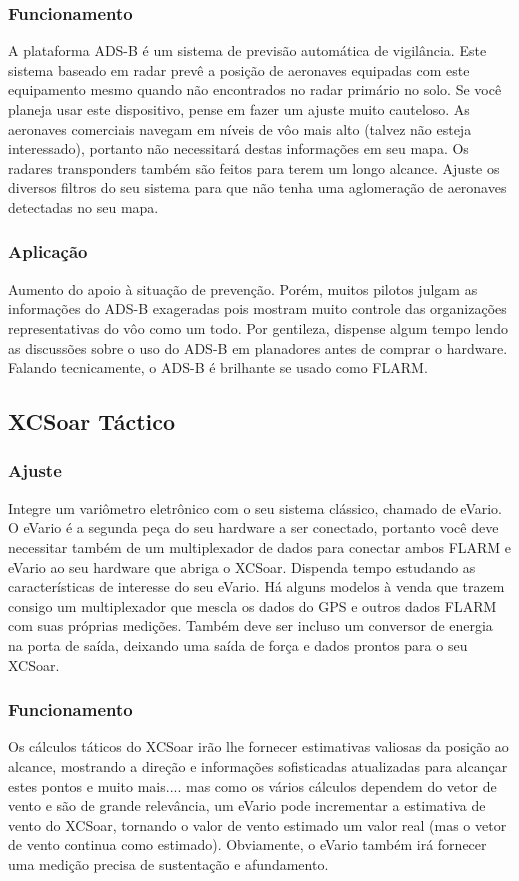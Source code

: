 \subsubsection*{Funcionamento} A plataforma ADS-B é um sistema de previsão automática de vigilância.  Este sistema baseado em radar prevê a posição de aeronaves equipadas com este equipamento mesmo quando não encontrados no radar primário no solo.  Se você planeja usar este dispositivo, pense em fazer um ajuste muito cauteloso.  As aeronaves comerciais navegam em níveis de vôo mais alto (talvez não esteja interessado), portanto não necessitará destas informações em seu mapa.  Os radares transponders também são feitos para terem um longo alcance.  Ajuste os diversos filtros do seu sistema para que não tenha uma aglomeração de aeronaves detectadas no seu mapa.

\subsubsection*{Aplicação} Aumento do apoio à situação de prevenção.  Porém, muitos pilotos julgam as informações do ADS-B exageradas pois mostram muito controle das organizações representativas do vôo como um todo.  Por gentileza, dispense algum tempo lendo as discussões sobre o uso do ADS-B em planadores antes de comprar o hardware.  Falando tecnicamente, o ADS-B é brilhante se usado como FLARM.

\subsection*{XCSoar Táctico}
\subsubsection*{Ajuste} Integre um variômetro eletrônico com o seu sistema clássico, chamado de eVario.  O eVario é a segunda peça do seu hardware a ser conectado, portanto você deve necessitar também de um multiplexador de dados para conectar ambos FLARM e eVario ao seu hardware que abriga o XCSoar.  Dispenda tempo estudando as características de interesse do seu eVario.  Há alguns modelos à venda que trazem consigo um multiplexador que mescla os dados do GPS e outros dados FLARM com suas próprias medições.  Também deve ser incluso um conversor de energia na porta de saída, deixando uma saída de força e dados prontos para o seu XCSoar. 

\subsubsection*{Funcionamento} Os cálculos táticos do XCSoar irão lhe fornecer estimativas valiosas da posição ao alcance, mostrando a direção e informações sofisticadas atualizadas para alcançar estes pontos e muito mais.... mas como os vários cálculos dependem do vetor de vento e são de grande relevância, um eVario pode incrementar a estimativa de vento do XCSoar, tornando o valor de vento estimado um valor real (mas o vetor de vento continua como estimado).  Obviamente, o eVario também irá fornecer uma medição precisa de sustentação e afundamento.

